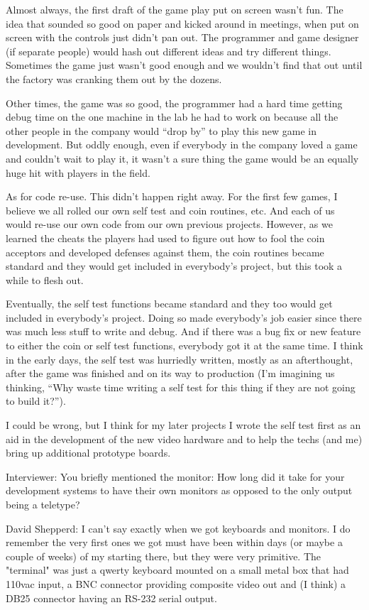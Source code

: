 Almost always, the first draft of the game play put on screen wasn't fun. The idea that sounded so good on paper and kicked around in meetings, when put on screen with the controls just didn't pan out. The programmer and game designer (if separate people) would hash out different ideas and try different things. Sometimes the game just wasn't good enough and we wouldn't find that out until the factory was cranking them out by the dozens. 

Other times, the game was so good, the programmer had a hard time getting debug time on the one machine in the lab he had to work on because all the other people in the company would “drop by” to play this new game in development. But oddly enough, even if everybody in the company loved a game and couldn't wait to play it, it wasn't a sure thing the game would be an equally huge hit with players in the field.

As for code re-use. This didn't happen right away. For the first few games, I believe we all rolled our own self test and coin routines, etc. And each of us would re-use our own code from our own previous projects. However, as we learned the cheats the players had used to figure out how to fool the coin acceptors and developed defenses against them, the coin routines became standard and they would get included in everybody's project, but this took a while to flesh out. 

Eventually, the self test functions became standard and they too would get included in everybody's project. Doing so made everybody's job easier since there was much less stuff to write and debug. And if there was a bug fix or new feature to either the coin or self test functions, everybody got it at the same time. I think in the early days, the self test was hurriedly written, mostly as an afterthought, after the game was finished and on its way to production (I'm imagining us thinking, “Why waste time writing a self test for this thing if they are not going to build it?”). 

I could be wrong, but I think for my later projects I wrote the self test first as an aid in the development of the new video hardware and to help the techs (and me) bring up additional prototype boards.

\textcolor{interviewer}{Interviewer:} You briefly mentioned the monitor: How long did it take for your development systems to have their own monitors as opposed to the only output being a teletype?

\textcolor{interviewee}{David Shepperd:} I can't say exactly when we got keyboards and monitors. I do remember the very first ones we got must have been within days (or maybe a couple of weeks) of my starting there, but they were very primitive. The "terminal" was just a qwerty keyboard mounted on a small metal box that had 110vac input, a BNC connector providing composite video out and (I think) a DB25 connector having an RS-232 serial output. 

